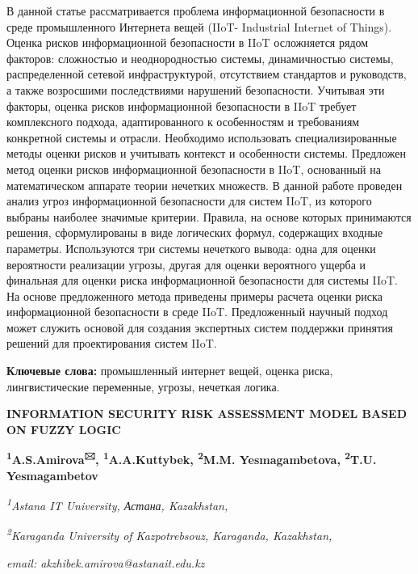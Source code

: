 \documentclass[
]{article}
\begin{document}
В данной статье рассматривается проблема информационной безопасности в
среде промышленного Интернета вещей (IIoT- Industrial Internet of
Things). Оценка рисков информационной безопасности в IIoT осложняется
рядом факторов: сложностью и неоднородностью системы, динамичностью
системы, распределенной сетевой инфраструктурой, отсутствием стандартов
и руководств, а также возросшими последствиями нарушений безопасности.
Учитывая эти факторы, оценка рисков информационной безопасности в IIoT
требует комплексного подхода, адаптированного к особенностям и
требованиям конкретной системы и отрасли. Необходимо использовать
специализированные методы оценки рисков и учитывать контекст и
особенности системы. Предложен метод оценки рисков информационной
безопасности в IIoT, основанный на математическом аппарате теории
нечетких множеств. В данной работе проведен анализ угроз информационной
безопасности для систем IIoT, из которого выбраны наиболее значимые
критерии. Правила, на основе которых принимаются решения, сформулированы
в виде логических формул, содержащих входные параметры. Используются три
системы нечеткого вывода: одна для оценки вероятности реализации угрозы,
другая для оценки вероятного ущерба и финальная для оценки риска
информационной безопасности для системы IIoT. На основе предложенного
метода приведены примеры расчета оценки риска информационной
безопасности в среде IIoT. Предложенный научный подход может служить
основой для создания экспертных систем поддержки принятия решений для
проектирования систем IIoT.

\textbf{Ключевые слова:} промышленный интернет вещей, оценка риска,
лингвистические переменные, угрозы, нечеткая логика.

\textbf{INFORMATION SECURITY RISK ASSESSMENT MODEL BASED ON FUZZY LOGIC}

\textbf{\textsuperscript{1}A.S.Amirova\textsuperscript{🖂},
\textsuperscript{1}A.A.Kuttybek, \textsuperscript{2}M.M. Yesmagambetova,
\textsuperscript{2}T.U. Yesmagambetov}

\emph{\textsuperscript{1}Astana IT University, Астана, Kazakhstan,}

\emph{\textsuperscript{2}Karaganda University of Kazpotrebsouz,
Karaganda, Kazakhstan,}

\emph{email: akzhibek.amirova@astanait.edu.kz}
\end{document}
